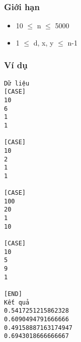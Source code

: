 \subsubsection{   Giới hạn  }
\begin{itemize}
	\item     10  $\le$  n  $\le$  5000   
	\item     1  $\le$  d, x, y  $\le$  n-1   
\end{itemize}

\subsubsection{   Ví dụ  }
\begin{verbatim}
Dữ liệu
[CASE]
10
6
1
1

[CASE]
10
2
1
1

[CASE]
100
20
1
10

[CASE]
10
5
9
1

[END]
Kết quả
0.5417251215862328
0.6090494791666666
0.49158887163174947
0.6943018666666667
\end{verbatim}
